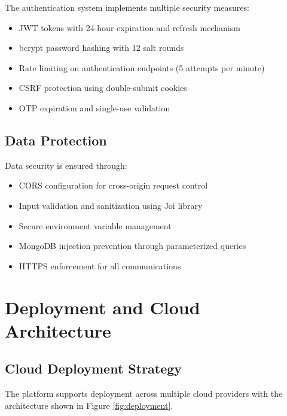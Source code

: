 \documentclass[conference]{IEEEtran}
\begin{document}
The authentication system implements multiple security measures:
\begin{itemize}
\item JWT tokens with 24-hour expiration and refresh mechanism
\item bcrypt password hashing with 12 salt rounds
\item Rate limiting on authentication endpoints (5 attempts per minute)
\item CSRF protection using double-submit cookies
\item OTP expiration and single-use validation
\end{itemize}

\subsection{Data Protection}

Data security is ensured through:
\begin{itemize}
\item CORS configuration for cross-origin request control
\item Input validation and sanitization using Joi library
\item Secure environment variable management
\item MongoDB injection prevention through parameterized queries
\item HTTPS enforcement for all communications
\end{itemize}

\section{Deployment and Cloud Architecture}

\subsection{Cloud Deployment Strategy}

The platform supports deployment across multiple cloud providers with the architecture shown in Figure \ref{fig:deployment}.
\end{document}
